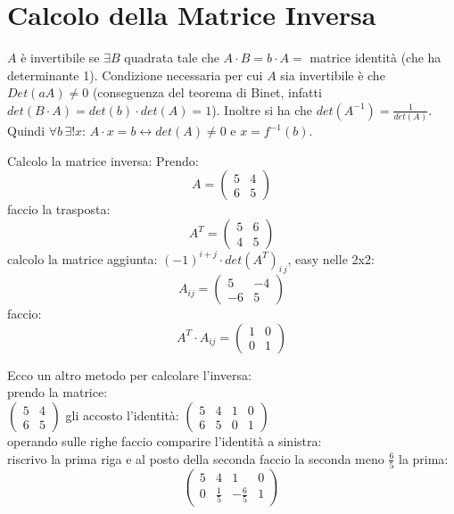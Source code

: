 \documentclass[a4paper,12pt, oneside]{book}
\begin{document}
\section{Calcolo della Matrice Inversa}
$A$ è invertibile se $\exists B$ quadrata tale che $A\cdot B= b\cdot A=$ matrice identità (che ha determinante 1). Condizione necessaria per cui $A$ sia invertibile è che $Det(aA)\neq 0$ (conseguenza del teorema di Binet, infatti $det(B\cdot A)=det(b)\cdot det(A)=1$). Inoltre si ha che $det(A^{-1})=\frac{1}{det(A)}$. Quindi $\forall b\, \exists !x:\, A\cdot x=b\longleftrightarrow det(A)\neq 0$ e $x=f^{-1}(b)$.
\begin{esempio}
	Calcolo la matrice inversa:
	Prendo:
	$$
		A=\left(\begin{matrix}
				5 & 4 \\
				6 & 5
			\end{matrix}\right)
	$$
	faccio la trasposta:
	$$
		A^T=\left(\begin{matrix}
				5 & 6 \\
				4 & 5
			\end{matrix}\right)
	$$
	calcolo la matrice aggiunta: $(-1)^{i+j}\cdot det(A^T)_{i\,j}$, easy nelle 2x2:
	$$
		A_{ij}=\left(\begin{matrix}
				5  & -4 \\
				-6 & 5
			\end{matrix}\right)
	$$
	faccio:
	$$
		A^T\cdot A_{ij}= \left(\begin{matrix}
				1 & 0 \\
				0 & 1
			\end{matrix}\right)
	$$
\end{esempio}
Ecco un altro metodo per calcolare l'inversa:\\
prendo la matrice:\\
$
	\left(\begin{matrix}
			5 & 4 \\
			6 & 5
		\end{matrix}\right)
$
gli accosto l'identità:
$
	\left(\begin{matrix}
			5 & 4 & 1 & 0 \\
			6 & 5 & 0 & 1
		\end{matrix}\right)
$\\
operando sulle righe faccio comparire l'identità a sinistra:\\
riscrivo la prima riga e al posto della seconda faccio la seconda meno $\frac{6}{5}$ la prima:
$$
	\left(\begin{matrix}
			5 & 4           & 1            & 0 \\
			0 & \frac{1}{5} & -\frac{6}{5} & 1
		\end{matrix}\right)
$$
\end{document}
